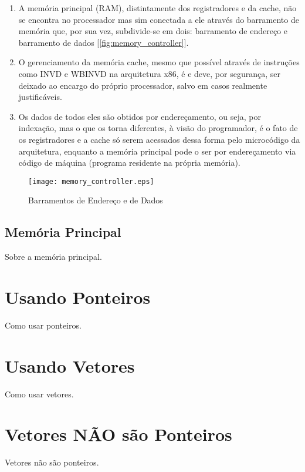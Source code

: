 \begin{enumerate}
\item A memória principal (RAM), distintamente dos registradores e da cache, não se encontra no processador mas sim conectada a ele através do barramento de memória que, por sua vez, subdivide-se em dois: barramento de endereço e barramento de dados [\autoref{fig:memory_controller}].
\item O gerenciamento da memória cache, mesmo que possível através de instruções como INVD e WBINVD na arquitetura x86, é e deve, por segurança, ser deixado ao encargo do próprio processador, salvo em casos realmente justificáveis.
\item Os dados de todos eles são obtidos por endereçamento, ou seja, por indexação, mas o que os torna diferentes, à visão do programador, é o fato de os registradores e a cache só serem acessados dessa forma pelo microcódigo da arquitetura, enquanto a memória principal pode o ser por endereçamento via código de máquina (programa residente na própria memória).
\end{enumerate}

\begin{figure}[!htp]
  \centering
  \texttt{[image: memory\_controller.eps]}
  \caption{Barramentos de Endereço e de Dados}
  \label{fig:memory_controller}
\end{figure}


\subsection{Memória Principal}

Sobre a memória principal.


\section{Usando Ponteiros}

Como usar ponteiros.


\section{Usando Vetores}

Como usar vetores.


\section{Vetores NÃO são Ponteiros}

Vetores não são ponteiros.